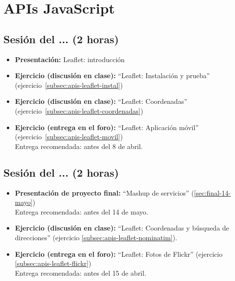 \documentclass[a4paper,12pt]{report}
\begin{document}
\section{APIs JavaScript}

\subsection{Sesión del ... (2 horas)}

\begin{itemize}
\item \textbf{Presentación:} Leaflet: introducción
\item \textbf{Ejercicio (discusión en clase):} ``Leaflet: Instalación y prueba'' (ejercicio~\ref{subsec:apis-leaflet-instal})
\item \textbf{Ejercicio (discusión en clase):} ``Leaflet: Coordenadas'' (ejercicio~\ref{subsec:apis-leaflet-coordenadas})
\item \textbf{Ejercicio (entrega en el foro):} ``Leaflet: Aplicación móvil'' (ejercicio~\ref{subsec:apis-leaflet-movil}) \\
  Entrega recomendada: antes del 8 de abril.
\end{itemize}

\subsection{Sesión del ... (2 horas)}

\begin{itemize}
\item \textbf{Presentación de proyecto final:} ``Mashup de servicios'' (\ref{sec:final-14-mayo}) \\
  Entrega recomendada: antes del 14 de mayo.
\item \textbf{Ejercicio (discusión en clase):} ``Leaflet: Coordenadas y búsqueda de direcciones'' (ejercicio \ref{subsec:apis-leaflet-nominatim}).
\item \textbf{Ejercicio (entrega en el foro):} ``Leaflet: Fotos de Flickr'' (ejercicio \ref{subsec:apis-leaflet-flickr})  \\
  Entrega recomendada: antes del 15 de abril.
\end{itemize}
\end{document}
